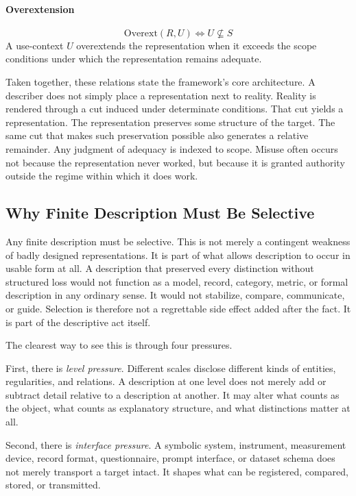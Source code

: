 \documentclass[11pt]{article}
\renewcommand{\emph}[1]{\textit{#1}}
\begin{document}
\paragraph{Overextension}
\[
\mathrm{Overext}(R,U) \iff U \not\subseteq S
\]
A use-context \(U\) overextends the representation when it exceeds the scope conditions under which the representation remains adequate.

Taken together, these relations state the framework's core architecture. A describer does not simply place a representation next to reality. Reality is rendered through a cut induced under determinate conditions. That cut yields a representation. The representation preserves some structure of the target. The same cut that makes such preservation possible also generates a relative remainder. Any judgment of adequacy is indexed to scope. Misuse often occurs not because the representation never worked, but because it is granted authority outside the regime within which it does work.

\subsection{Why Finite Description Must Be Selective}

Any finite description must be selective. This is not merely a contingent weakness of badly designed representations. It is part of what allows description to occur in usable form at all. A description that preserved every distinction without structured loss would not function as a model, record, category, metric, or formal description in any ordinary sense. It would not stabilize, compare, communicate, or guide. Selection is therefore not a regrettable side effect added after the fact. It is part of the descriptive act itself. \cite{frigg_hartmann_models_sep,adriaans_information_sep}

The clearest way to see this is through four pressures.

First, there is \emph{level pressure}. Different scales disclose different kinds of entities, regularities, and relations. A description at one level does not merely add or subtract detail relative to a description at another. It may alter what counts as the object, what counts as explanatory structure, and what distinctions matter at all. \cite{levels_org_biology_sep}

Second, there is \emph{interface pressure}. A symbolic system, instrument, measurement device, record format, questionnaire, prompt interface, or dataset schema does not merely transport a target intact. It shapes what can be registered, compared, stored, or transmitted. \cite{adriaans_information_sep,star_ethnography_of_infrastructure,bowker_star_sorting_things_out}
\end{document}
